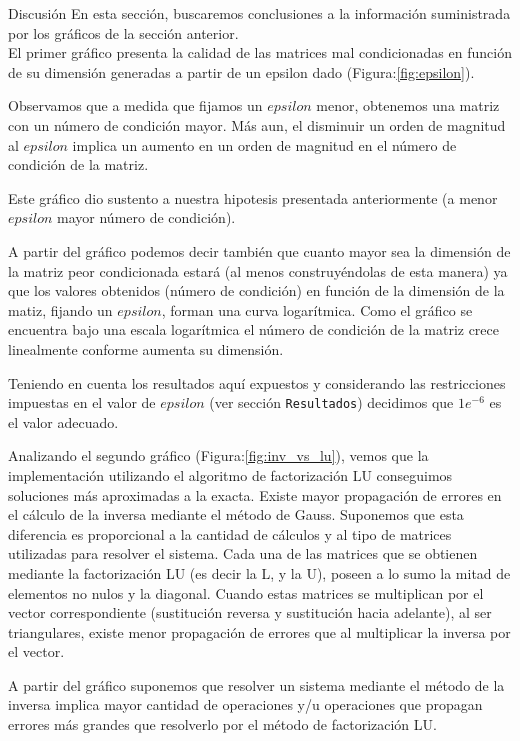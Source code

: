 \begin{section}{Discusión}
	En esta sección, buscaremos conclusiones a la información suministrada por los gráficos de la sección anterior.\\
	
	El primer gráfico presenta la calidad de las matrices mal condicionadas en función de su dimensión generadas a 
	partir de un epsilon dado (Figura:\ref{fig:epsilon}).
	
	Observamos que a medida que fijamos un $epsilon$ menor, obtenemos una matriz con un número de condición mayor. 
	Más aun, el disminuir un orden de magnitud al $epsilon$ implica un aumento en un orden de magnitud en el número
	 de condición de la matriz.
	
	Este gráfico dio sustento a nuestra hipotesis presentada anteriormente (a menor $epsilon$ mayor número de 
	condición).
	
	A partir del gráfico podemos decir también que cuanto mayor sea la dimensión de la  matriz peor condicionada 
	estará (al menos construyéndolas de esta manera) ya que los valores obtenidos (número de condición) en función 
	de la dimensión de la matiz, fijando un $epsilon$, forman una curva logarítmica. Como el gráfico se encuentra 
	bajo una escala logarítmica el número de condición de la matriz crece linealmente conforme aumenta su dimensión.
	
	Teniendo en cuenta los resultados aquí expuestos y considerando las restricciones impuestas en el valor de 
	$epsilon$ (ver sección \texttt{Resultados}) decidimos que $1e^{-6}$ es el valor adecuado.\pa
	
	Analizando el segundo gráfico (Figura:\ref{fig:inv_vs_lu}), vemos que la implementación utilizando el algoritmo de factorización LU conseguimos soluciones más aproximadas a la exacta. Existe mayor propagación de errores en el cálculo de la inversa mediante el método de Gauss. Suponemos que esta diferencia es proporcional a la cantidad de cálculos y al tipo de matrices utilizadas para resolver el sistema. Cada una de las matrices que se obtienen mediante la factorización LU (es decir la L, y la U), poseen a lo sumo la mitad de elementos no nulos y la diagonal. Cuando estas matrices se multiplican por el vector correspondiente (sustitución reversa y sustitución hacia adelante), al ser triangulares, existe menor propagación de errores que al multiplicar la inversa por el vector.
	
	A partir del gráfico suponemos que resolver un sistema mediante el método de la inversa implica mayor cantidad de operaciones y/u operaciones que propagan errores más grandes que resolverlo por el método de factorización LU.\pa
		

\end{section}
